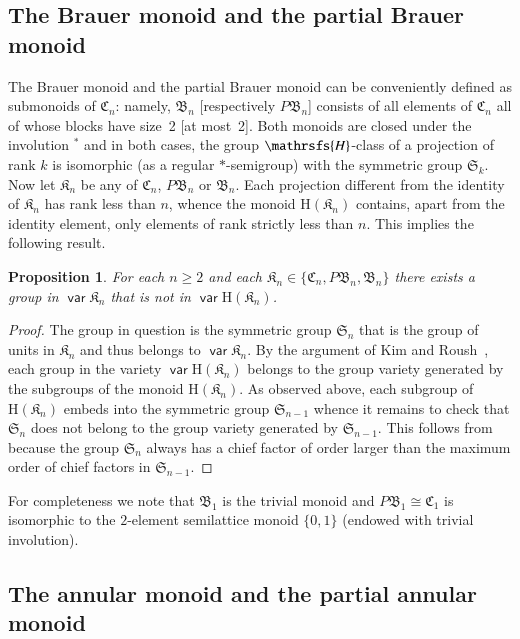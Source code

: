 \documentclass[preprint,1p,times]{elsarticle}
\DeclareMathOperator{\var}{\mathsf{var}}
\numberwithin{equation}{section}
\newtheorem{Prop}[Thm]{Proposition}
\theoremstyle{remark}
\def\Hc{\mathrsfs{H}}
\def\H{\mathrm H}
\def\C{\mathfrak{C}}
\def\B{\mathfrak{B}}
\def\Sim{\mathfrak{S}}
\begin{document}
\subsection{The Brauer monoid and the partial Brauer monoid}

The Brauer monoid and the partial Brauer monoid can be conveniently defined as submonoids of $\C_n$: namely, $\B_n$
[respectively $P\B_n$] consists of all elements of $\C_n$ all of whose blocks have size~2 [at most~2]. Both monoids are
closed under the involution $^*$ and in both cases, the group $\Hc$-class of a projection of rank $k$ is isomorphic (as
a regular $*$-semigroup) with the symmetric group $\Sim_k$. Now let $\mathfrak{K}_n$ be any of $\C_n$, $P\B_n$ or
$\B_n$. Each projection different from the identity of $\mathfrak{K}_n$ has rank less than $n$, whence the monoid
$\H(\mathfrak{K}_n)$ contains, apart from the identity element, only elements of rank strictly less than $n$. This
implies the following result.

\begin{Prop}
\label{groups in the gap} For each $n\ge 2$ and each $\mathfrak{K}_n\in \{\C_n,P\B_n,\B_n\}$ there exists a group in
$\var\mathfrak{K}_n$ that is not in $\var\H(\mathfrak{K}_n)$.
\end{Prop}
\begin{proof}
The group in question is the symmetric group $\Sim_n$ that is the group of units in $\mathfrak{K}_n$ and thus belongs
to $\var\mathfrak{K}_n$. By the argument of Kim and Roush~\cite{KR}, each group in the variety $\var\H(\mathfrak{K}_n)$
belongs to the group variety generated by the subgroups of the monoid $\H(\mathfrak{K}_n)$. As observed above, each
subgroup of $\H(\mathfrak{K}_n)$ embeds into the symmetric group $\Sim_{n-1}$ whence it remains to check that $\Sim_n$
does not belong to the group variety generated by $\Sim_{n-1}$. This follows from \cite[Theorem 51.2]{Ne} because the
group $\Sim_n$ always has a chief factor of order larger than the maximum order of chief factors in $\Sim_{n-1}$.
\end{proof}

For completeness we note that $\B_1$ is the trivial monoid and $P\B_1\cong \C_1$ is isomorphic to the $2$-element
semilattice monoid $\{0,1\}$ (endowed with trivial involution).

\subsection{The annular monoid and the partial annular monoid}
\end{document}
